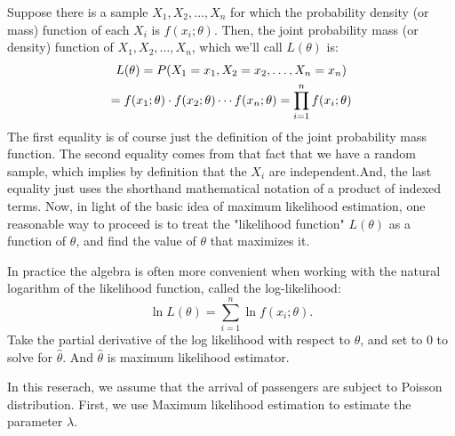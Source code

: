 \documentclass{mcmthesis}
\begin{document}
		Suppose there is a sample ${X_1,X_2,\dots,X_n}$ for which the probability density (or mass) function of each ${X_i}$ is ${f(x_i;\theta)}$.  Then, the joint probability mass (or density) function of ${X_1,X_2,\dots,X_n}$, which we'll call ${L(\theta)}$ is:
			\begin{gather}
				L( \theta) = P(X_1 = x_1, X_2 = x_2, \dots, X_n = x_n) \notag \\
				= f(x_1; \theta)\cdot f(x_2; \theta) \cdots f(x_n; \theta) = \prod_{i=1}^{n}f(x_i; \theta) \label{flag1}
			\end{gather}
		The first equality is of course just the definition of the joint probability mass function. The second equality comes from that fact that we have a random sample, which implies by definition that the ${X_i}$ are independent.And, the last equality just uses the shorthand mathematical notation of a product of indexed terms. Now, in light of the basic idea of maximum likelihood estimation, one reasonable way to proceed is to treat the "likelihood function" ${L(\theta)}$ as a function of ${\theta}$, and find the value of ${\theta}$ that maximizes it.

		In practice the algebra is often more convenient when working with the natural logarithm of the likelihood function, called the log-likelihood:
			\begin{equation}
				\ln L(\theta) = \sum_{i=1}^{n}\ln f(x_i;\theta). 
			\end{equation}
		Take the partial derivative of the log likelihood with respect to ${\theta}$, and set to 0 to solve for ${\hat \theta}$. And ${\hat \theta}$ is maximum likelihood estimator.

		In this reserach, we assume that the arrival of passengers are subject to Poisson distribution. First, we use Maximum likelihood estimation to estimate the parameter ${\lambda}$.
\end{document}
